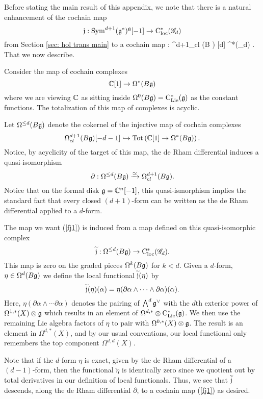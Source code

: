 Before stating the main result of this appendix, we note that there is a natural enhancement of the cochain map
\[
\mathfrak j : {\rm Sym}^{d+1} (\mathfrak g^*)^{\mathfrak g} [-1] \to {\rm C}_{\rm loc}^*(\mathscr G_d)
\]
from Section \ref{sec: hol trans main} to a cochain map
\beqn\label{fj1}
\fj : \Omega^{d+1}_{cl} (B \fg) [d] \to \cloc^*(\sG_d)  .
\eeqn
That we now describe. 

Consider the map of cochain complexes
\[
\mathbb C[1] \to \Omega^*(B \mathfrak g)
\]
where we are viewing $\mathbb C$ as sitting inside $\Omega^0(B \mathfrak g) = {\rm C}_{{\rm Lie}}^*(\mathfrak g)$ as the constant functions. 
The totalization of this map of complexes is acyclic. 

Let $\Omega^{\leq d}(B \mathfrak g)$ denote the cokernel of the injective map of cochain complexes
\[
\Omega^{d+1}_{cl} (B \mathfrak g) [-d-1] \hookrightarrow {\rm Tot}\left(\mathbb C[1] \to \Omega^*(B \mathfrak g)\right)  .
\]
Notice, by acyclicity of the target of this map, the de Rham differential induces a quasi-isomorphism
\[
\partial : \Omega^{\leq d}(B \mathfrak g) \xrightarrow{\simeq} \Omega^{d+1}_{cl}(B \mathfrak g) .
\] 
Notice that on the formal disk $\mathfrak g = \mathbb C^n[-1]$, this quasi-ismorphism implies the standard fact that every closed $(d+1)$-form can be written as the de Rham differential applied to a $d$-form. 

The map we want (\ref{fj1}) is induced from a map defined on this quasi-isomorphic complex
\[
\widetilde{\mathfrak j} : \Omega^{\leq d}(B \mathfrak g) \to {\rm C}_{\rm loc}^*(\mathscr G_d) .
\] 
This map is zero on the graded pieces $\Omega^k (B \mathfrak g)$ for $k < d$. 
Given a $d$-form, $\eta \in \Omega^d(B \mathfrak g)$ we define the local functional $\widetilde{\mathfrak j}(\eta)$ by 
\[
\widetilde{\mathfrak j} (\eta) (\alpha) = \eta (\partial \alpha \wedge \cdots \wedge \partial \alpha) (\alpha) .
\]
Here, $\eta (\partial \alpha \wedge \cdots \partial \alpha)$ denotes the pairing of $\bigwedge^d \mathfrak g^\vee$ with the $d$th exterior power of $\Omega^{1,*}(X) \otimes \mathfrak g$ which results in an element of $\Omega^{d,*} \otimes {\rm C}_{{\rm Lie}}^*(\mathfrak g)$. 
We then use the remaining Lie algebra factors of $\eta$ to pair with $\Omega^{0,*}(X) \otimes \mathfrak g$. 
The result is an element in $\Omega^{d,*}(X)$, and by our usual conventions, our local functional only remembers the top component $\Omega^{d,d}(X)$. 

Note that if the $d$-form $\eta$ is exact, given by the de Rham differential of a $(d-1)$-form, then the functional $\widetilde{\eta}$ is identically zero since we quotient out by total derivatives in our definition of local functionals. 
Thus, we see that $\widetilde{\mathfrak j}$ descends, along the de Rham differential $\partial$, to a cochain map (\ref{fj1}) as desired. 


